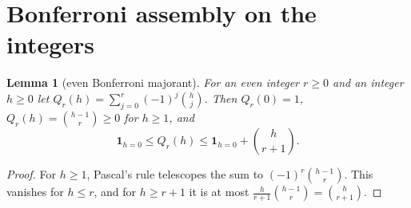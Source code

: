 \documentclass[10pt,reqno]{amsart}
\newtheorem{lemma}[theorem]{Lemma}
\theoremstyle{remark}
\newcommand{\ind}{\mathbf1}
\begin{document}
\section{Bonferroni assembly on the integers}\label{sec:assembly}
\begin{lemma}[even Bonferroni majorant]\label{lem:Bonferroni}
For an even integer $r\geq0$ and an integer $h\geq0$ let
$Q_r(h)=\sum_{j=0}^r(-1)^j\binom hj$.  Then $Q_r(0)=1$,
$Q_r(h)=\binom{h-1}r\geq0$ for $h\geq1$, and
\begin{equation}\label{eq:Bonferroni}
 \ind_{h=0}\leq Q_r(h)\leq\ind_{h=0}+\binom h{r+1}.
\end{equation}
\end{lemma}
\begin{proof}
For $h\geq1$, Pascal's rule telescopes the sum to $(-1)^r\binom{h-1}r$.
This vanishes for $h\leq r$, and for $h\geq r+1$ it is at most
$\frac h{r+1}\binom{h-1}r=\binom h{r+1}$.
\end{proof}
\end{document}
